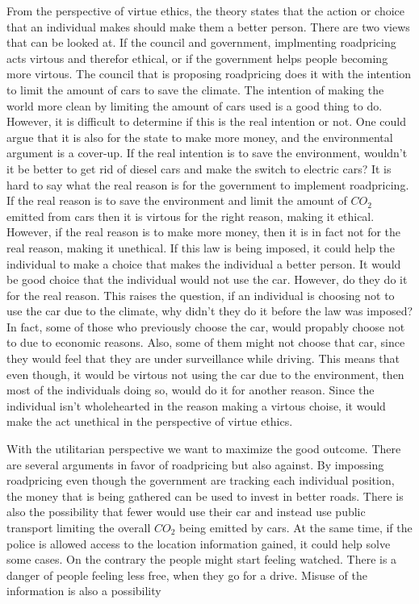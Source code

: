 From the perspective of virtue ethics, the theory states that the action or choice that an individual makes should make them a better person. There are two views that can be looked at. If the council and government, implmenting roadpricing acts virtous and therefor ethical, or if the government helps people becoming more virtous. The council that is proposing roadpricing does it with the intention to limit the amount of cars to save the climate. The intention of making the world more clean by limiting the amount of cars used is a good thing to do. However, it is difficult to determine if this is the real intention or not. One could argue that it is also for the state to make more money, and the environmental argument is a cover-up. If the real intention is to save the environment, wouldn't it be better to get rid of diesel cars and make the switch to electric cars? It is hard to say what the real reason is for the government to implement roadpricing. If the real reason is to save the environment and limit the amount of $CO_2$ emitted from cars then it is virtous for the right reason, making it ethical. However, if the real reason is to make more money, then it is in fact not for the real reason, making it unethical.   
If this law is being imposed, it could help the individual to make a choice that makes the individual a better person. It would be good choice that the individual would not use the car. However, do they do it for the real reason. This raises the question, if an individual is choosing not to use the car due to the climate, why didn't they do it before the law was imposed?  
In fact, some of those who previously choose the car, would propably choose not to due to economic reasons. Also, some of them might not choose that car, since they would feel that they are under surveillance while driving. This means that even though, it would be virtous not using the car due to the environment, then most of the individuals doing so, would do it for another reason. Since the individual isn't wholehearted in the reason making a virtous choise, it would make the act unethical in the perspective of virtue ethics.

With the utilitarian perspective we want to maximize the good outcome. There are several arguments in favor of roadpricing but also against. By impossing roadpricing even though the government are tracking each individual position, the money that is being gathered can be used to invest in better roads. There is also the possibility that fewer would use their car and instead use public transport limiting the overall $CO_2$ being emitted by cars. At the same time, if the police is allowed access to the location information gained, it could help solve some cases. On the contrary the people might start feeling watched. There is a danger of people feeling less free, when they go for a drive. Misuse of the information is also a possibility